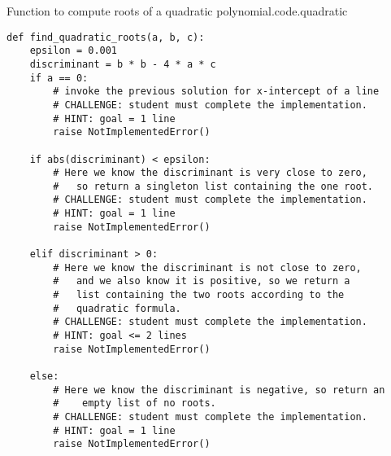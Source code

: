 \begin{listing}{Function to compute roots of a quadratic polynomial.}{code.quadratic}
\begin{minipage}[c]{0.95\textwidth}\begin{lstlisting}
def find_quadratic_roots(a, b, c):
    epsilon = 0.001
    discriminant = b * b - 4 * a * c
    if a == 0:
        # invoke the previous solution for x-intercept of a line
        # CHALLENGE: student must complete the implementation.
        # HINT: goal = 1 line
        raise NotImplementedError()

    if abs(discriminant) < epsilon:
        # Here we know the discriminant is very close to zero,
        #   so return a singleton list containing the one root.
        # CHALLENGE: student must complete the implementation.
        # HINT: goal = 1 line
        raise NotImplementedError()

    elif discriminant > 0:
        # Here we know the discriminant is not close to zero,
        #   and we also know it is positive, so we return a
        #   list containing the two roots according to the
        #   quadratic formula.
        # CHALLENGE: student must complete the implementation.
        # HINT: goal <= 2 lines
        raise NotImplementedError()

    else:
        # Here we know the discriminant is negative, so return an
        #    empty list of no roots.
        # CHALLENGE: student must complete the implementation.
        # HINT: goal = 1 line
        raise NotImplementedError()

\end{lstlisting}\end{minipage}\end{listing}

